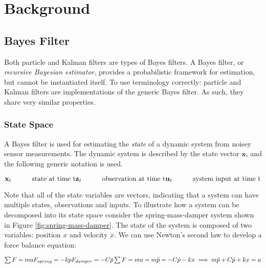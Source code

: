 \section{Background}

\subsection{Bayes Filter}
Both particle and Kalman filters are types of Bayes filters. A Bayes filter,
or \emph{recursive Bayesian estimator}, provides a probabilistic framework
for estimation, but cannot be instantiated itself. To use terminology correctly:
particle and Kalman filters are implementations of the generic Bayes filter. As
such, they share very similar properties.

\subsubsection{State Space}
A Bayes filter is used for estimating the \emph{state} of a dynamic system from
noisey sensor measurements. The dynamic system is described by the state
vector $\textbf{x}$, and the following generic notation is used.

\begin{math}
\mathbf{x}_{t}\quad\quad\quad\textrm{state at time t} \\
\mathbf{z}_{t}\quad\quad\quad\textrm{observation at time t} \\
\mathbf{u}_{t}\quad\quad\quad\textrm{system input at time t}
\end{math}

Note that all of the state variables are vectors, indicating that a system can
have multiple states, observations and inputs. To illustrate how a system can be
decomposed into its state space consider the spring-mass-damper system shown in
Figure \ref{fig:spring-mass-damper}. The state of the system is composed of two
variables: position $x$ and velocity $\dot{x}$. We can use Newton's second law
to develop a force balance equation:

\begin{math}
\sum{F} = ma \\\\
F_{spring} = -kp \\
F_{damper} = -C\dot{p} \\\\
\sum{F} = ma = m\ddot{p} = -C\dot{p} -kx \\\\
\implies m\ddot{p} + C\dot{p} + kx = u
\end{math}

